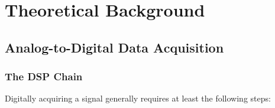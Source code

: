 \chapter{Theoretical Background} %
\label{ch:analog-to-digital_data_aquisition}

\section{Analog-to-Digital Data Acquisition}
\label{sec:adc-acquisition}

\subsection{The DSP Chain}
\label{subsec:dsp-chain}

Digitally acquiring a signal generally requires at least the following steps:

